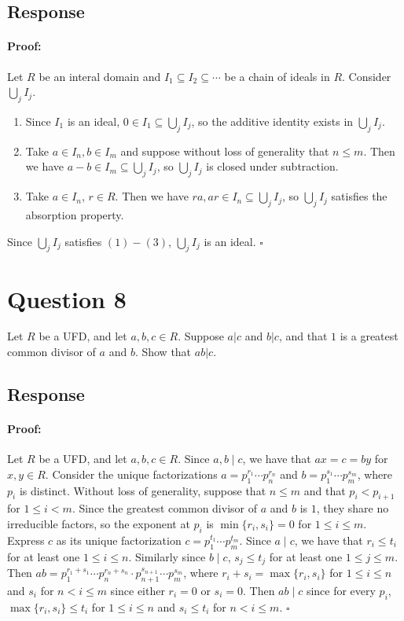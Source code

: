 \documentclass [12pt] {article}
\newenvironment{proof}{\paragraph{Proof:}}{\hfill$\square$}
\begin{document}
\subsection*{Response}
\begin{proof}
    Let $R$ be an interal domain and $I_1 \subseteq I_2 \subseteq \cdots$ be a chain of ideals in
    $R$. Consider $\bigcup_j I_j$.
    \begin{enumerate}
        \item Since $I_1$ is an ideal, $0 \in I_1 \subseteq \bigcup_j I_j$, so the additive identity
            exists in $\bigcup_j I_j$.
        \item Take $a \in I_n, b \in I_m$ and suppose without loss of generality that $n \leq m$.
            Then we have $a - b \in I_m \subseteq \bigcup_j I_j$, so $\bigcup_j I_j$ is closed under
            subtraction.
        \item Take $a \in I_n$, $r \in R$. Then we have $ra, ar \in I_n \subseteq \bigcup_j I_j$,
            so $\bigcup_j I_j$ satisfies the absorption property.
    \end{enumerate}
    Since $\bigcup_j I_j$ satisfies $(1)-(3)$, $\bigcup_j I_j$ is an ideal.
\end{proof}
\newpage

\section*{Question 8}
Let $R$ be a UFD, and let $a,b,c\in R$. Suppose $a|c$ and $b|c$, and that $1$ is a greatest common
divisor of $a$ and $b$. Show that $ab|c$.
\subsection*{Response}
\begin{proof}
    Let $R$ be a UFD, and let $a, b, c \in R$. Since $a, b \mid c$, we have that $ax = c = by$ for
    $x, y \in R$. Consider the unique factorizations $a = p_1^{r_1} \cdots p_n^{r_n}$ and
    $b = p_1^{s_1} \cdots p_m^{s_m}$, where $p_i$ is distinct. Without loss of generality, suppose
    that $n \leq m$ and that $p_i < p_{i + 1}$ for $1 \leq i < m$.
    Since the greatest common divisor of $a$ and $b$ is $1$, they share no irreducible factors, so
    the exponent at $p_i$ is $\min\{ r_i, s_i \} = 0$ for $1 \leq i \leq m$. Express $c$ as its
    unique factorization $c = p_1^{t_1} \cdots p_m^{t_m}$. Since $a \mid c$, we have that
    $r_i \leq t_i$ for at least one $1 \leq i \leq n$. Similarly since $b \mid c$, $s_j \leq t_j$
    for at least one $1 \leq j \leq m$. Then
    $ab = p_1^{r_1 + s_1} \cdots p_n^{r_n + s_n} \cdot p_{n + 1}^{s_{n + 1}} \cdots p_m^{s_m}$,
    where $r_i + s_i = \max \{ r_i, s_i \}$ for $1 \leq i \leq n$ and $s_i$ for $n < i \leq m$ since
    either $r_i = 0$ or $s_i = 0$. Then $ab \mid c$ since for every $p_i$,
    $\max\{r_i, s_i\} \leq t_i$ for $1 \leq i \leq n$ and $s_i \leq t_i$ for $n < i \leq m$.
\end{proof}
\newpage
\end{document}
